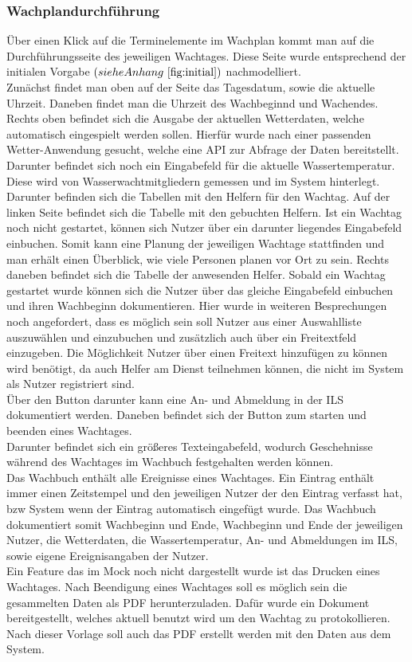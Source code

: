 \documentclass[fontsize=12pt,openright,oneside,paper=a4,BCOR=1cm]{scrbook}
\begin{document}
\subsubsection{Wachplandurchführung}
Über einen Klick auf die Terminelemente im Wachplan kommt man auf die Durchführungsseite des jeweiligen Wachtages. Diese Seite wurde entsprechend der initialen Vorgabe $(siehe Anhang ~\ref{fig:initial})$ nachmodelliert. \\
Zunächst findet man oben auf der Seite das Tagesdatum, sowie die aktuelle Uhrzeit. Daneben findet man die Uhrzeit des Wachbeginnd und Wachendes. \\
Rechts oben befindet sich die Ausgabe der aktuellen Wetterdaten, welche automatisch eingespielt werden sollen. Hierfür wurde nach einer passenden Wetter-Anwendung gesucht, welche eine API zur Abfrage der Daten bereitstellt. Darunter befindet sich noch ein Eingabefeld für die aktuelle Wassertemperatur. Diese wird von Wasserwachtmitgliedern gemessen und im System hinterlegt. \\ 
Darunter befinden sich die Tabellen mit den Helfern für den Wachtag. Auf der linken Seite befindet sich die Tabelle mit den gebuchten Helfern. Ist ein Wachtag noch nicht gestartet, können sich Nutzer über ein darunter liegendes Eingabefeld einbuchen. Somit kann eine Planung der jeweiligen Wachtage stattfinden und man erhält einen Überblick, wie viele Personen planen vor Ort zu sein. Rechts daneben befindet sich die Tabelle der anwesenden Helfer. Sobald ein Wachtag gestartet wurde können sich die Nutzer über das gleiche Eingabefeld einbuchen und ihren Wachbeginn dokumentieren. Hier wurde in weiteren Besprechungen noch angefordert, dass es möglich sein soll Nutzer aus einer Auswahlliste auszuwählen und einzubuchen und zusätzlich auch über ein Freitextfeld einzugeben. Die Möglichkeit Nutzer über einen Freitext hinzufügen zu können wird benötigt, da auch Helfer am Dienst teilnehmen können, die nicht im System als Nutzer registriert sind. \\
Über den Button darunter kann eine An- und Abmeldung in der ILS dokumentiert werden. Daneben befindet sich der Button zum starten und beenden eines Wachtages.\\
Darunter befindet sich ein größeres Texteingabefeld, wodurch Geschehnisse während des Wachtages im Wachbuch festgehalten werden können.\\
Das Wachbuch enthält alle Ereignisse eines Wachtages. Ein Eintrag enthält immer einen Zeitstempel und den jeweiligen Nutzer der den Eintrag verfasst hat, bzw \glqq System\grqq{} wenn der Eintrag automatisch eingefügt wurde. Das Wachbuch dokumentiert somit Wachbeginn und Ende, Wachbeginn und Ende der jeweiligen Nutzer, die Wetterdaten, die Wassertemperatur, An- und Abmeldungen im ILS, sowie eigene Ereignisangaben der Nutzer.\\
Ein Feature das im Mock noch nicht dargestellt wurde ist das Drucken eines Wachtages. Nach Beendigung eines Wachtages soll es möglich sein die gesammelten Daten als PDF herunterzuladen. Dafür wurde ein Dokument bereitgestellt, welches aktuell benutzt wird um den Wachtag zu protokollieren. Nach dieser Vorlage soll auch das PDF erstellt werden mit den Daten aus dem System.
\end{document}
